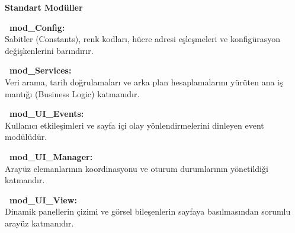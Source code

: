 \hfill
\begin{minipage}[t]{0.48\textwidth}
    {\Large \bfseries \textcolor{primary}{Standart Modüller}} \\[0.2cm]

    \begin{tcolorbox}[colback=lightgray,colframe=bordergray,leftrule=3pt,boxrule=0.4pt,top=4.5pt,bottom=4.5pt]
        \textbf{\textcolor{primary}{\faCog\ mod\_Config:}}\\
        \small Sabitler (Constants), renk kodları, hücre adresi eşleşmeleri ve konfigürasyon değişkenlerini barındırır.
    \end{tcolorbox}

    \begin{tcolorbox}[colback=lightgray,colframe=bordergray,leftrule=3pt,boxrule=0.4pt,top=4.5pt,bottom=4.5pt]
        \textbf{\textcolor{primary}{\faServer\ mod\_Services:}}\\
        \small Veri arama, tarih doğrulamaları ve arka plan hesaplamalarını yürüten ana iş mantığı (Business Logic) katmanıdır.
    \end{tcolorbox}

    \begin{tcolorbox}[colback=lightgray,colframe=bordergray,leftrule=3pt,boxrule=0.4pt,top=4.5pt,bottom=4.5pt]
        \textbf{\textcolor{primary}{\faMousePointer\ mod\_UI\_Events:}}\\
        \small Kullanıcı etkileşimleri ve sayfa içi olay yönlendirmelerini dinleyen event modülüdür.
    \end{tcolorbox}

    \begin{tcolorbox}[colback=lightgray,colframe=bordergray,leftrule=3pt,boxrule=0.4pt,top=4.5pt,bottom=4.5pt]
        \textbf{\textcolor{primary}{\faSlidersH\ mod\_UI\_Manager:}}\\
        \small Arayüz elemanlarının koordinasyonu ve oturum durumlarının yönetildiği katmandır.
    \end{tcolorbox}

    \begin{tcolorbox}[colback=lightgray,colframe=bordergray,leftrule=3pt,boxrule=0.4pt,top=4.5pt,bottom=4.5pt]
        \textbf{\textcolor{primary}{\faPaintBrush\ mod\_UI\_View:}}\\
        \small Dinamik panellerin çizimi ve görsel bileşenlerin sayfaya basılmasından sorumlu arayüz katmanıdır.
    \end{tcolorbox}


\end{minipage}
